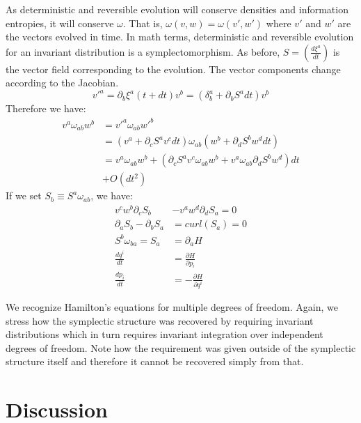 \documentclass[11pt]{article}
\begin{document}
As deterministic and reversible evolution will conserve densities and information entropies, it will conserve $\omega$. That is, $\omega(v, w) = \omega(v',w')$ where $v'$ and $w'$ are the vectors evolved in time. In math terms, deterministic and reversible evolution for an invariant distribution is a symplectomorphism. As before, $S = \left(\frac{d\xi^a}{dt}\right)$ is the vector field corresponding to the evolution. The vector components change according to the Jacobian.
\begin{equation}
	v'^a = \partial_b \xi^a(t+dt) v^b = (\delta^a_b + \partial_b S^a dt) v^b
\end{equation}
Therefore we have:
\begin{align*}
v^{a} \omega_{ab} w^{b} &= v'^{a} \omega_{ab} w'^{b}  \\
&= (v^{a} + \partial_{c} S^{a} v^{c} dt) \omega_{ab} ( w^{b} + \partial_{d} S^{b} w^{d} dt) \\
&= v^{a} \omega_{ab} w^{b} + (\partial_{c} S^{a} v^{c} \omega_{ab} w^{b} + v^{a} \omega_{ab} \partial_{d} S^{b} w^{d}) dt \\ &+ O(dt^2)
\end{align*}
If we set $S_{b} \equiv S^{a} \omega_{ab}$, we have:
\begin{equation}
\begin{aligned}
v^{c} w^{b} \partial_{c} S_{b} &- v^{a} w^{d} \partial_{d} S_{a} = 0\\
\partial_{a} S_{b} - \partial_{b} S_{a} &= curl(S_{a}) = 0 \\
S^{b} \omega_{ba} = S_{a} &= \partial_{a}H \\
\frac{dq^i}{dt} &= \frac{\partial H}{\partial p_i}  \\
\frac{dp_i}{dt} &= - \frac{\partial H}{\partial q^i}
\end{aligned}
\end{equation}

We recognize Hamilton's equations for multiple degrees of freedom. Again, we stress how the symplectic structure was recovered by requiring invariant distributions which in turn requires invariant integration over independent degrees of freedom. Note how the requirement was given outside of the symplectic structure itself and therefore it cannot be recovered simply from that.

\section{Discussion}
\end{document}
